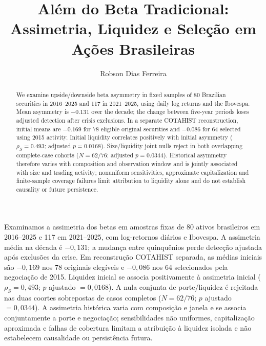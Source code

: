\documentclass[12 pt]{article}
\title{Além do Beta Tradicional: Assimetria, Liquidez e Seleção em Ações Brasileiras}
\author{Robson Dias Ferreira\inst{1}}
\begin{document}
\maketitle
\begin{abstract}
We examine upside/downside beta asymmetry in fixed samples of 80 Brazilian securities in 2016--2025 and 117 in 2021--2025, using daily log returns and the Ibovespa. Mean asymmetry is $-0.131$ over the decade; the change between five-year periods loses adjusted detection after crisis exclusions. In a separate COTAHIST reconstruction, initial means are $-0.169$ for 78 eligible original securities and $-0.086$ for 64 selected using 2015 activity. Initial liquidity correlates positively with initial asymmetry ($\rho_S=0.493$; adjusted $p=0.0168$). Size/liquidity joint nulls reject in both overlapping complete-case cohorts ($N=62/76$; adjusted $p=0.0344$). Historical asymmetry therefore varies with composition and observation window and is jointly associated with size and trading activity; nonuniform sensitivities, approximate capitalization and finite-sample coverage failures limit attribution to liquidity alone and do not establish causality or future persistence.
\end{abstract}
\begin{resumo}
Examinamos a assimetria dos betas em amostras fixas de 80 ativos brasileiros em 2016--2025 e 117 em 2021--2025, com log-retornos diários e Ibovespa. A assimetria média na década é $-0,131$; a mudança entre quinquênios perde detecção ajustada após exclusões da crise. Em reconstrução COTAHIST separada, as médias iniciais são $-0,169$ nos 78 originais elegíveis e $-0,086$ nos 64 selecionados pela negociação de 2015. Liquidez inicial se associa positivamente à assimetria inicial ($\rho_S=0,493$; $p$ ajustado $=0,0168$). A nula conjunta de porte/liquidez é rejeitada nas duas coortes sobrepostas de casos completos ($N=62/76$; $p$ ajustado $=0,0344$). A assimetria histórica varia com composição e janela e se associa conjuntamente a porte e negociação; sensibilidades não uniformes, capitalização aproximada e falhas de cobertura limitam a atribuição à liquidez isolada e não estabelecem causalidade ou persistência futura.
\end{resumo}

\begingroup\small


\endgroup
\end{document}
